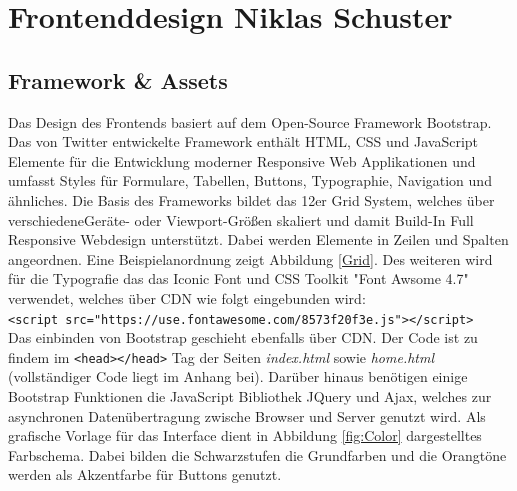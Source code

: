\section{Frontenddesign \textnormal{\textsf{\small{Niklas Schuster}}}}
\subsection{Framework \& Assets}
Das Design des Frontends basiert auf dem Open-Source Framework Bootstrap. Das von Twitter entwickelte Framework enthält HTML, CSS und JavaScript Elemente für die Entwicklung moderner Responsive Web Applikationen und umfasst Styles für Formulare, Tabellen, Buttons, Typographie, Navigation und ähnliches. Die Basis des Frameworks bildet das 12er Grid System, welches über verschiedeneGeräte- oder Viewport-Größen skaliert und damit Build-In Full Responsive Webdesign unterstützt. Dabei werden Elemente in Zeilen und  Spalten angeordnen. Eine Beispielanordnung zeigt Abbildung \ref{Grid}. Des weiteren wird für die Typografie das das Iconic Font und CSS Toolkit "Font Awsome 4.7" verwendet, welches über CDN wie folgt eingebunden wird: \\ \verb!<script src="https://use.fontawesome.com/8573f20f3e.js"></script>!\\
Das einbinden von Bootstrap geschieht ebenfalls über CDN. Der Code ist zu findem im \verb!<head></head>! Tag der Seiten \textit{index.html} sowie \textit{home.html} (vollständiger Code liegt im Anhang bei). Darüber hinaus benötigen einige Bootstrap Funktionen die JavaScript Bibliothek JQuery und Ajax, welches zur asynchronen Datenübertragung zwische Browser und Server genutzt wird. Als grafische Vorlage für das Interface dient in Abbildung \ref{fig:Color} dargestelltes Farbschema. Dabei bilden die Schwarzstufen die Grundfarben und die Orangtöne werden als Akzentfarbe für Buttons genutzt.

